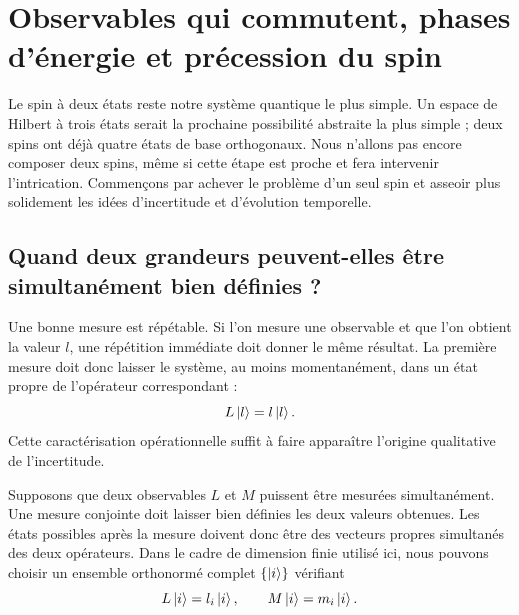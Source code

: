 \chapter{Observables qui commutent, phases d’énergie et précession du spin}


Le spin à deux états reste notre système quantique le plus simple. Un espace de Hilbert à trois états serait la prochaine possibilité abstraite la plus simple ; deux spins ont déjà quatre états de base orthogonaux. Nous n’allons pas encore composer deux spins, même si cette étape est proche et fera intervenir l’intrication. Commençons par achever le problème d’un seul spin et asseoir plus solidement les idées d’incertitude et d’évolution temporelle.

\section{Quand deux grandeurs peuvent-elles être simultanément bien définies ?}

Une bonne mesure est répétable. Si l’on mesure une observable et que l’on obtient la valeur \(l\), une répétition immédiate doit donner le même résultat. La première mesure doit donc laisser le système, au moins momentanément, dans un état propre de l’opérateur correspondant :
\begin{equation}
L\left\lvert l\right\rangle=l\left\lvert l\right\rangle.
\end{equation}
Cette caractérisation opérationnelle suffit à faire apparaître l’origine qualitative de l’incertitude.

Supposons que deux observables \(L\) et \(M\) puissent être mesurées simultanément. Une mesure conjointe doit laisser bien définies les deux valeurs obtenues. Les états possibles après la mesure doivent donc être des vecteurs propres simultanés des deux opérateurs. Dans le cadre de dimension finie utilisé ici, nous pouvons choisir un ensemble orthonormé complet \(\{\left\lvert i\right\rangle\}\) vérifiant
\begin{equation}
L\left\lvert i\right\rangle=l_i\left\lvert i\right\rangle,
\qquad
M\left\lvert i\right\rangle=m_i\left\lvert i\right\rangle.
\label{eq:l5-common-eigenvectors}
\end{equation}

